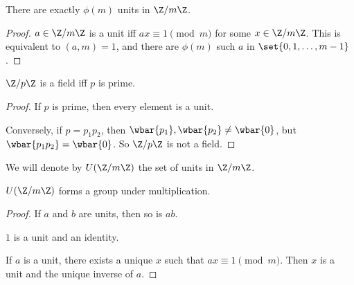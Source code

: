 
\begin{proposition}
    There are exactly $\phi(m)$ units in $\Z/m\Z$.
\end{proposition}
\begin{proof}
    $a \in \Z/m\Z$ is a unit iff $ax \equiv 1 \pmod{m}$ for some
    $x \in \Z/m\Z$.
    This is equivalent to $(a, m) = 1$, and there are $\phi(m)$
    such $a$ in $\set{0, 1, \dots, m-1}$.
\end{proof}

\begin{corollary}
    $\Z/p\Z$ is a field iff $p$ is prime.
\end{corollary}
\begin{proof}
    If $p$ is prime, then every element is a unit.

    Conversely, if $p = p_1 p_2$,
    then $\wbar{p_1}, \wbar{p_2} \ne \wbar{0}$,
    but $\wbar{p_1 p_2} = \wbar{0}$.
    So $\Z/p\Z$ is not a field.
\end{proof}

\begin{notation}
    We will denote by $U(\Z/m\Z)$ the set of units in $\Z/m\Z$.
\end{notation}
\begin{lemma}
    $U(\Z/m\Z)$ forms a group under multiplication.
\end{lemma}
\begin{proof}
    If $a$ and $b$ are units, then so is $ab$.

    $1$ is a unit and an identity.

    If $a$ is a unit, there exists a unique $x$ such that
    $ax \equiv 1 \pmod{m}$.
    Then $x$ is a unit and the unique inverse of $a$.
\end{proof}

